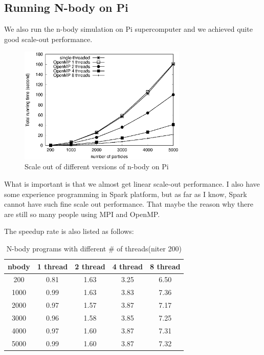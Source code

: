 \documentclass{article}
\begin{document}
\subsection{Running N-body on Pi}
We also run the n-body simulation on Pi supercomputer and we achieved quite good scale-out performance.
\begin{figure}[H]
	\centering
	\includegraphics[width=8cm]{fig/pi_scale_out.eps}
	\caption{Scale out of different versions of n-body on Pi}
\end{figure}
What is important is that we almost get linear scale-out performance. I also have some experience programming in Spark platform,
but as far as I know, Spark cannot have such fine scale out performance. That maybe the reason why there are still so many people
using MPI and OpenMP.

The speedup rate is also listed as follows:

\begin{table}[H]
\centering
	\begin{tabular}{c|c|c|c|c}
	nbody	& 1 thread & 2 thread & 4 thread & 8 thread \\ \hline
	200		& 0.81 & 1.63 & 3.25 & 6.50 \\ \hline
	1000	& 0.99 & 1.63 & 3.83 & 7.36 \\ \hline
	2000    & 0.97 & 1.57 & 3.87 & 7.17 \\ \hline
	3000    & 0.96 & 1.58 & 3.85 & 7.25 \\ \hline
	4000	& 0.97 & 1.60 & 3.87 & 7.31 \\ \hline
	5000	& 0.99 & 1.60 & 3.87 & 7.32
	\end{tabular}
	\caption{N-body programs with different \# of threads(niter 200)}
\end{table}
\end{document}
